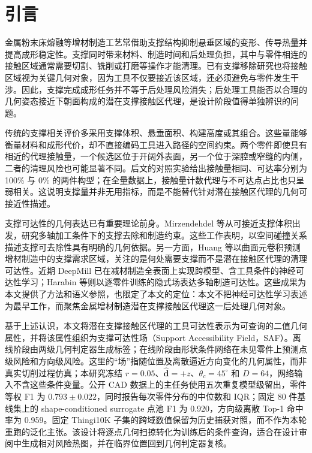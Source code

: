 \section{引言}

金属粉末床熔融等增材制造工艺常借助支撑结构抑制悬垂区域的变形、传导热量并提高成形稳定性。支撑同时带来材料、制造时间和后处理负担\cite{jiang2018support}，其中与零件相连的接触区域通常需要切割、铣削或打磨等操作才能清理。已有支撑移除研究也将接触区域视为关键几何对象，因为工具不仅要接近该区域，还必须避免与零件发生干涉\cite{nelaturi2019automatic}。因此，支撑完成成形任务并不等于后处理风险消失；后处理工具能否以合理的几何姿态接近下朝面构成的潜在支撑接触区代理，是设计阶段值得单独辨识的问题。

传统的支撑相关评价多采用支撑体积、悬垂面积、构建高度或其组合。这些量能够衡量材料和成形代价，却不直接编码工具进入路径的空间约束。两个零件即使具有相近的代理接触量，一个候选区位于开阔外表面，另一个位于深腔或窄缝的内侧，二者的清理风险也可能显著不同。后文的对照实验给出接触量相同、可达率分别为 100\% 与 0\% 的两件构型；在全量数据上，接触量计数代理与不可达点占比也只呈弱相关。这说明支撑量并非无用指标，而是不能替代针对潜在接触区代理的几何可接近性描述。

支撑可达性的几何表达已有重要理论前身。Mirzendehdel 等从可接近支撑体积出发，研究多轴加工条件下的支撑去除和制造约束\cite{mirzendehdel2021orientation,mirzendehdel2022topology}。这些工作表明，以空间碰撞关系描述支撑可去除性具有明确的几何依据。另一方面，Huang 等以曲面元卷积预测增材制造中的支撑需求区域，关注的是何处需要支撑而不是潜在接触区代理的清理可达性\cite{huang2019surfel}。近期 DeepMill 已在减材制造全表面上实现跨模型、含工具条件的神经可达性学习\cite{zhong2025deepmill}；Harabin 等则以逐零件训练的隐式场表达多轴制造可达性\cite{harabin2023deep}。这些成果为本文提供了方法和语义参照，也限定了本文的定位：本文不把神经可达性学习表述为最早工作，而聚焦金属增材制造潜在支撑接触区代理这一后处理几何对象。

基于上述认识，本文将潜在支撑接触区代理的工具可达性表示为可查询的二值几何属性，并将该属性组织为支撑可达性场（Support Accessibility Field，SAF）。离线阶段由两级几何判定器生成标签；在线阶段由形状条件网络在未见零件上预测点级风险和方向级风险。这里的“场”指随位置及离散逼近方向变化的几何属性，而非真实切削过程仿真；本研究冻结 $r=0.05$、$\hat{\mathbf d}=+z$、$\theta_c=45^\circ$ 和 $D=64$，网络输入不含这些条件变量。公开 CAD 数据上的主任务使用五次重复模型级留出，零件等权 F1 为 $0.793\pm0.022$，同时报告每次零件分布的中位数和 IQR；固定 80 件基线集上的 shape-conditioned surrogate 点池 F1 为 0.920，方向级离散 Top-1 命中率为 0.959。固定 Thingi10K 子集的跨域数值保留为历史捕获对照，而不作为本轮重跑的泛化主张。该设计将逐点几何扫掠转化为训练后的条件查询，适合在设计审阅中生成相对风险热图，并在临界位置回到几何判定器复核。

